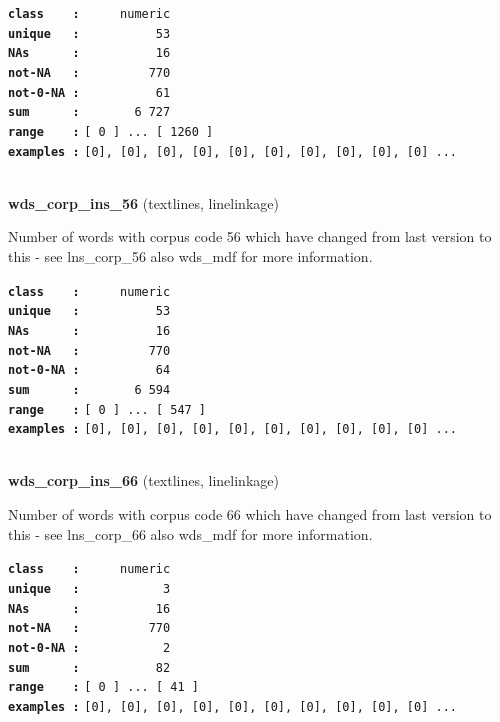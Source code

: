 \documentclass[]{article}
\begin{document}
\textbf{\texttt{class\ \ \ \ :}} \texttt{~~~~~numeric}\\
\textbf{\texttt{unique\ \ \ :}} \texttt{~~~~~~~~~~53}\\
\textbf{\texttt{NAs\ \ \ \ \ \ :}} \texttt{~~~~~~~~~~16}\\
\textbf{\texttt{not-NA\ \ \ :}} \texttt{~~~~~~~~~770}\\
\textbf{\texttt{not-0-NA\ :}} \texttt{~~~~~~~~~~61}\\
\textbf{\texttt{sum\ \ \ \ \ \ :}} \texttt{~~~~~~~6~727}\\
\textbf{\texttt{range\ \ \ \ :}}
\texttt{{[}\ 0\ {]}\ ...\ {[}\ 1260\ {]}}\\
\textbf{\texttt{examples\ :}}
\texttt{{[}0{]},\ {[}0{]},\ {[}0{]},\ {[}0{]},\ {[}0{]},\ {[}0{]},\ {[}0{]},\ {[}0{]},\ {[}0{]},\ {[}0{]}\ ...}\\

~

\textbf{wds\_corp\_ins\_56} (textlines, linelinkage)

Number of words with corpus code 56 which have changed from last version
to this - see lns\_corp\_56 also wds\_mdf for more information.

\textbf{\texttt{class\ \ \ \ :}} \texttt{~~~~~numeric}\\
\textbf{\texttt{unique\ \ \ :}} \texttt{~~~~~~~~~~53}\\
\textbf{\texttt{NAs\ \ \ \ \ \ :}} \texttt{~~~~~~~~~~16}\\
\textbf{\texttt{not-NA\ \ \ :}} \texttt{~~~~~~~~~770}\\
\textbf{\texttt{not-0-NA\ :}} \texttt{~~~~~~~~~~64}\\
\textbf{\texttt{sum\ \ \ \ \ \ :}} \texttt{~~~~~~~6~594}\\
\textbf{\texttt{range\ \ \ \ :}}
\texttt{{[}\ 0\ {]}\ ...\ {[}\ 547\ {]}}\\
\textbf{\texttt{examples\ :}}
\texttt{{[}0{]},\ {[}0{]},\ {[}0{]},\ {[}0{]},\ {[}0{]},\ {[}0{]},\ {[}0{]},\ {[}0{]},\ {[}0{]},\ {[}0{]}\ ...}\\

~

\textbf{wds\_corp\_ins\_66} (textlines, linelinkage)

Number of words with corpus code 66 which have changed from last version
to this - see lns\_corp\_66 also wds\_mdf for more information.

\textbf{\texttt{class\ \ \ \ :}} \texttt{~~~~~numeric}\\
\textbf{\texttt{unique\ \ \ :}} \texttt{~~~~~~~~~~~3}\\
\textbf{\texttt{NAs\ \ \ \ \ \ :}} \texttt{~~~~~~~~~~16}\\
\textbf{\texttt{not-NA\ \ \ :}} \texttt{~~~~~~~~~770}\\
\textbf{\texttt{not-0-NA\ :}} \texttt{~~~~~~~~~~~2}\\
\textbf{\texttt{sum\ \ \ \ \ \ :}} \texttt{~~~~~~~~~~82}\\
\textbf{\texttt{range\ \ \ \ :}}
\texttt{{[}\ 0\ {]}\ ...\ {[}\ 41\ {]}}\\
\textbf{\texttt{examples\ :}}
\texttt{{[}0{]},\ {[}0{]},\ {[}0{]},\ {[}0{]},\ {[}0{]},\ {[}0{]},\ {[}0{]},\ {[}0{]},\ {[}0{]},\ {[}0{]}\ ...}\\
\end{document}
